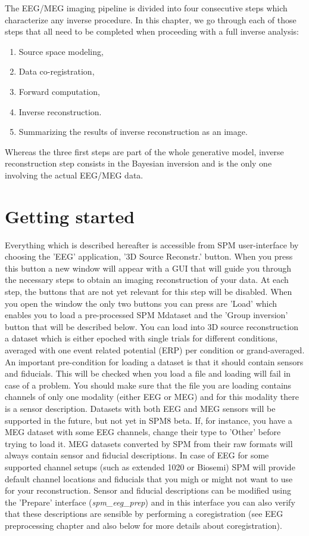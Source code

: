 The EEG/MEG imaging pipeline is divided into four consecutive steps which characterize
any inverse procedure. In this chapter, we go through each of those steps that all need 
to be completed when proceeding with a full inverse analysis:

\begin{enumerate}
    \item Source space modeling,
    \item Data co-registration,
    \item Forward computation,
    \item Inverse reconstruction.
    \item Summarizing the results of inverse reconstruction as an image.
\end{enumerate}

Whereas the three first steps are part of the whole generative model, inverse reconstruction
step consists in the Bayesian inversion and is the only one involving the actual EEG/MEG data.\\

\section{Getting started}

Everything which is described hereafter is accessible from SPM user-interface by choosing 
the 'EEG' application, '3D Source Reconstr.' button. When you press this button a new window
will appear with a GUI that will guide you through the necessary steps to obtain an imaging
reconstruction of your data. At each step, the buttons that are not yet relevant for this step
will be disabled. When you open the window the only two buttons you can press are 'Load' which enables you
to load a pre-processed SPM M\EEG dataset and the 'Group inversion' button that will be described below. 
You can load into 3D source reconstruction a dataset which is either epoched with single trials for different
conditions, averaged with one event related potential (ERP) per condition or grand-averaged. An important pre-condition
for loading a dataset is that it should contain sensors and fiducials. This will be checked when you load a file
and loading will fail in case of a problem. You should make sure that the file you are loading
contains channels of only one modality (either EEG or MEG) and for this modality there is a sensor description. 
Datasets with both EEG and MEG sensors will be supported in the future, but not yet in SPM8 beta.
If, for instance, you have a MEG dataset with some EEG channels, change their type to 'Other' before trying to load it.
MEG datasets converted by SPM from their raw formats will always contain
sensor and fiducial descriptions. In case of EEG for some supported channel setups (such as extended 1020 or Biosemi)
SPM will provide default channel locations and fiducials that you migh or might not want to use for your reconstruction.
Sensor and fiducial descriptions can be modified using the 'Prepare' interface (\textit{spm\_eeg\_prep}) and in this
interface you can also verify that these descriptions are sensible by performing a coregistration (see EEG preprocessing
chapter and also below for more details about coregistration). 

